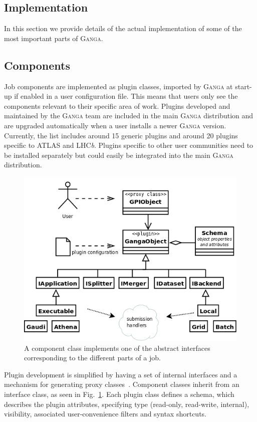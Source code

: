 \documentclass{elsart}
\def\lhcb {LHC{\em b\/}\xspace}
\def\atlas {ATLAS\xspace}
\def\ganga {\textsc{Ganga}\xspace}
\newcommand{\qq}[1]{#1}
\begin{document}
\begin{linenumbers}
\section{Implementation}
\label{sec:implementation}
In this section we provide details of the actual implementation of some of the
most important parts of \ganga.

\subsection{Components}
\label{sec:ComponentImplementation}
Job components are implemented as plugin classes, imported by \ganga
at start-up if enabled in a user configuration file. This means that
users only see the components relevant to their specific area of
work. \qq{Plugins developed and maintained by the \ganga
team are included in the main \ganga distribution and are upgraded
automatically when a user installs a newer \ganga version. Currently,
the list includes around 15 generic plugins and around 20 plugins
specific to \atlas and \lhcb. Plugins specific to other user
communities need to be installed separately but could easily be
integrated into the main \ganga distribution.  }

\begin{figure}
  \centering
  \includegraphics[width=14cm]{ganga-objects}  
  \caption{A component class implements one of the abstract interfaces
    corresponding to the different parts of a job.}
  \label{fig:Components}
\end{figure}
Plugin development is simplified by having a set of internal interfaces and a
mechanism for generating proxy classes~\cite{GoF}. Component classes inherit from an interface class,
as seen in Fig.~\ref{fig:Components}. Each plugin class defines a schema, which
describes the plugin attributes, specifying type
(read-only, read-write, internal), visibility, associated user-convenience filters
and syntax shortcuts.


\end{linenumbers}
\end{document}
